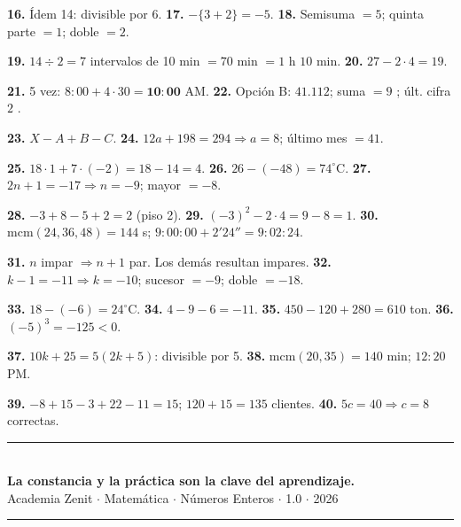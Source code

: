 \documentclass[11pt, letterpaper]{article}
\begin{document}
\textbf{16.} \'Idem 14: divisible por 6. \quad \textbf{17.} $-\{3+2\}=-5$. \quad \textbf{18.} Semisuma $=5$; quinta parte $=1$; doble $=2$.

\textbf{19.} $14\div 2=7$ intervalos de 10 min $=70$ min $=1$ h $10$ min. \quad \textbf{20.} $27-2\cdot 4=19$.

\textbf{21.} 5\textordfeminine{} vez: $8{:}00+4\cdot 30=\mathbf{10{:}00}$ AM. \quad \textbf{22.} Opci\'on B: $41.112$; suma $=9$ \checkmark{}; \'ult. cifra $2$ \checkmark{}.

\textbf{23.} $X-A+B-C$. \quad \textbf{24.} $12a+198=294\Rightarrow a=8$; \'ultimo mes $=41$.

\textbf{25.} $18\cdot 1+7\cdot(-2)=18-14=4$. \quad \textbf{26.} $26-(-48)=74^\circ$C. \quad \textbf{27.} $2n+1=-17\Rightarrow n=-9$; mayor $=-8$.

\textbf{28.} $-3+8-5+2=2$ (piso 2). \quad \textbf{29.} $(-3)^2-2\cdot 4=9-8=1$. \quad \textbf{30.} $\text{mcm}(24,36,48)=144$ s; $9{:}00{:}00+2'24''=9{:}02{:}24$.

\textbf{31.} $n$ impar $\Rightarrow n+1$ par. Los dem\'as resultan impares. \quad \textbf{32.} $k-1=-11\Rightarrow k=-10$; sucesor $=-9$; doble $=-18$.

\textbf{33.} $18-(-6)=24^\circ$C. \quad \textbf{34.} $4-9-6=-11$. \quad \textbf{35.} $450-120+280=610$ ton. \quad \textbf{36.} $(-5)^3=-125<0$.

\textbf{37.} $10k+25=5(2k+5)$: divisible por 5. \quad \textbf{38.} $\text{mcm}(20,35)=140$ min; $12{:}20$ PM.

\textbf{39.} $-8+15-3+22-11=15$; $120+15=135$ clientes. \quad \textbf{40.} $5c=40\Rightarrow c=8$ correctas.

\vspace{8pt}
\begin{center}
  \rule{\linewidth}{1.5pt}\\[4pt]
  {\large\bfseries\color{zenitnavy} La constancia y la pr\'actica son la clave del aprendizaje.}\\[2pt]
  {\color{zenitgold}\small Academia Zenit $\cdot$ Matem\'atica $\cdot$ N\'umeros Enteros $\cdot$ 1.0 $\cdot$ 2026}
  \rule{\linewidth}{1.5pt}
\end{center}
\end{document}
